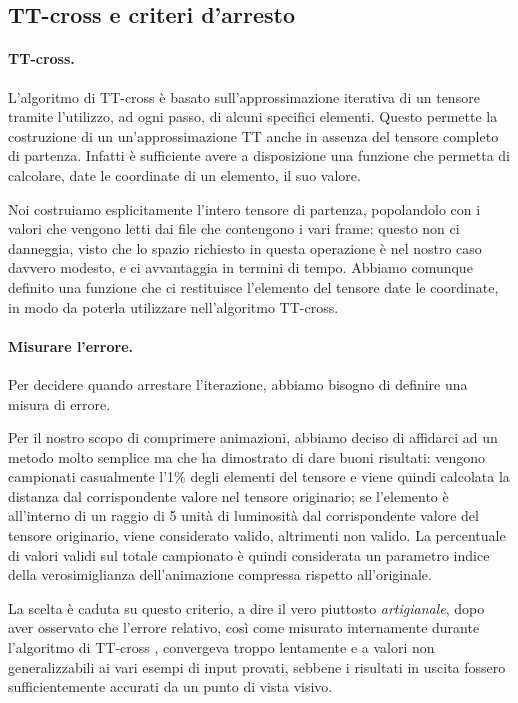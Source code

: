 \documentclass[11pt,a4paper]{article}
\begin{document}
\subsection{TT-cross e criteri d'arresto}
\paragraph{TT-cross.}
L'algoritmo di TT-cross è basato sull'approssimazione iterativa di un tensore tramite l'utilizzo, ad ogni passo, di alcuni specifici elementi.
Questo permette la costruzione di un un'approssimazione TT anche in assenza del tensore completo di partenza. Infatti è sufficiente avere a disposizione una funzione che permetta di calcolare, date le coordinate di un elemento, il suo valore.

Noi costruiamo esplicitamente l'intero tensore di partenza, popolandolo con i valori che vengono letti dai file che contengono i vari frame: questo non ci danneggia, visto che lo spazio richiesto in questa operazione è nel nostro caso davvero modesto, e ci avvantaggia in termini di tempo. Abbiamo comunque definito una funzione che ci restituisce l'elemento del tensore date le coordinate, in modo da poterla utilizzare nell'algoritmo TT-cross.

\paragraph{Misurare l'errore.}
Per decidere quando arrestare l'iterazione, abbiamo bisogno di definire una misura di errore.

Per il nostro scopo di comprimere animazioni, abbiamo deciso di affidarci ad un metodo molto semplice ma che ha dimostrato di dare buoni risultati: vengono campionati casualmente l'1\% degli elementi del tensore e viene quindi calcolata la distanza dal corrispondente valore nel tensore originario; se l'elemento è all'interno di un raggio di 5 unità di luminosità dal corrispondente valore del tensore originario, viene considerato valido, altrimenti non valido.
La percentuale di valori validi sul totale campionato è quindi considerata un parametro indice della verosimiglianza dell'animazione compressa rispetto all'originale.

La scelta è caduta su questo criterio, a dire il vero piuttosto \emph{artigianale}, dopo aver osservato che l'errore relativo, così come misurato internamente durante l'algoritmo di TT-cross , convergeva troppo lentamente e a valori non generalizzabili ai vari esempi di input provati, sebbene i risultati in uscita fossero sufficientemente accurati da un punto di vista visivo.
\end{document}
